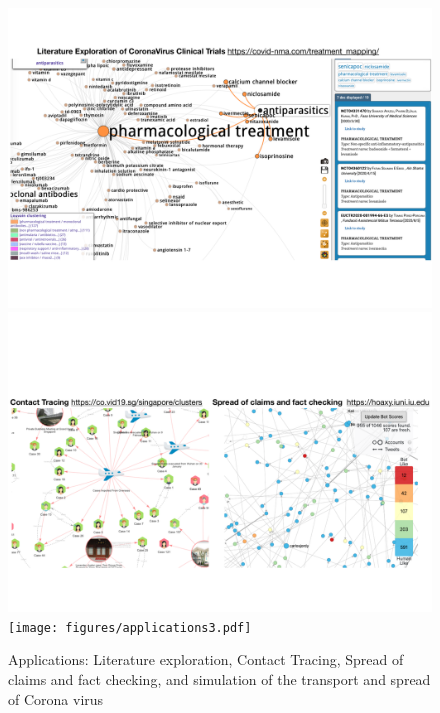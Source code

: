 \documentclass[10pt,journal,compsoc]{IEEEtran}
\begin{document}
\begin{figure}
	\includegraphics[width=\textwidth]{figures/applications1.pdf}
	\includegraphics[width=\linewidth]{figures/applications2.pdf}
	\texttt{[image: figures/applications3.pdf]}
	\caption{Applications: Literature exploration, Contact Tracing, Spread of claims and fact checking, and simulation of the transport and spread of Corona virus}
	\label{fig:applications}
\end{figure}
\end{document}
